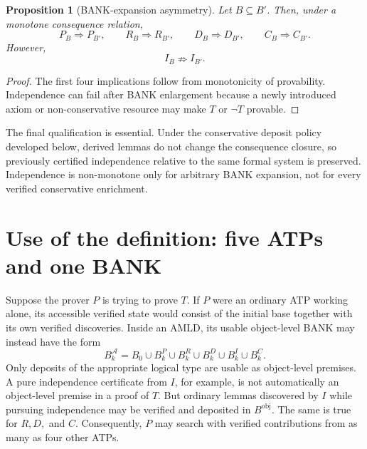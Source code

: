 \documentclass[11pt]{article}
\newtheorem{proposition}[definition]{Proposition}
\theoremstyle{remark}
\begin{document}
\begin{proposition}[BANK-expansion asymmetry]
Let $B\subseteq B'$. Then, under a monotone consequence relation,
\[
P_B\Rightarrow P_{B'},\qquad R_B\Rightarrow R_{B'},\qquad D_B\Rightarrow D_{B'},\qquad C_B\Rightarrow C_{B'}.
\]
However,
\[
I_B\nRightarrow I_{B'}.
\]
\end{proposition}
\begin{proof}
The first four implications follow from monotonicity of provability. Independence can fail after BANK enlargement because a newly introduced axiom or non-conservative resource may make $T$ or $\neg T$ provable.
\end{proof}
The final qualification is essential. Under the conservative deposit policy developed below, derived lemmas do not change the consequence closure, so previously certified independence relative to the same formal system is preserved. Independence is non-monotone only for arbitrary BANK expansion, not for every verified conservative enrichment.

\section{Use of the definition: five ATPs and one BANK}
Suppose the prover $P$ is trying to prove $T$. If $P$ were an ordinary ATP working alone, its accessible verified state would consist of the initial base together with its own verified discoveries. Inside an AMLD, its usable object-level BANK may instead have the form
\[
B_k^{\mathcal A}=B_0\cup B_k^P\cup B_k^R\cup B_k^D\cup B_k^I\cup B_k^C.
\]
Only deposits of the appropriate logical type are usable as object-level premises. A pure independence certificate from $I$, for example, is not automatically an object-level premise in a proof of $T$. But ordinary lemmas discovered by $I$ while pursuing independence may be verified and deposited in $B^{\mathrm{obj}}$. The same is true for $R,D,$ and $C$. Consequently, $P$ may search with verified contributions from as many as four other ATPs.
\end{document}
